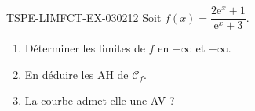\begin{exercice}{TSPE-LIMFCT-EX-030}{2}{12}
Soit $f(x) = \dfrac{2\mathrm{e}^x + 1}{\mathrm{e}^x + 3}$.
\begin{enumerate}
  \item Déterminer les limites de $f$ en $+\infty$ et $-\infty$.
  \item En déduire les AH de $\mathcal{C}_f$.
  \item La courbe admet-elle une AV ?
\end{enumerate}
\end{exercice}
